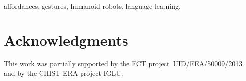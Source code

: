 \documentclass[journal]{IEEEtran}
\begin{document}
\begin{IEEEkeywords}
affordances, gestures, humanoid robots, language learning.
\end{IEEEkeywords}











\section*{Acknowledgments}

This work was partially supported by the FCT project~UID/EEA/50009/2013 and by the CHIST-ERA project IGLU.

\appendix


\printbibliography

%
\end{document}
